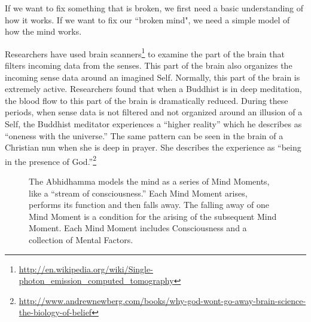 If we want to fix something that is broken, we first need a basic understanding of how it works. If we want to fix our ``broken mind", we need a simple model of how the mind works.

\pagebreak

Researchers have used brain scanners\footnote{\url{http://en.wikipedia.org/wiki/Single-photon_emission_computed_tomography}} to examine the part of the brain that filters incoming data from the senses. This part of the brain also organizes the incoming sense data around an imagined Self. Normally, this part of the brain is extremely active. Researchers found that when a Buddhist is in deep meditation, the blood flow to this part of the brain is dramatically reduced. During these periods, when sense data is not filtered and not organized around an illusion of a Self, the Buddhist meditator experiences a “higher reality” which he describes as “oneness with the universe.” The same pattern can be seen in the brain of a Christian nun when she is deep in prayer. She describes the experience as “being in the presence of God.”\footnote{\url{http://www.andrewnewberg.com/books/why-god-wont-go-away-brain-science-the-biology-of-belief}}

\begin{figure}[H]
\centering

\caption[The Abhidhamma models the mind as a series of Mind Moments, like a “stream of consciousness.” Each Mind Moment arises, performs its function and then falls away. The falling away of one Mind Moment is a condition for the arising of the subsequent Mind Moment. Each Mind Moment includes Consciousness and a collection of Mental Factors.]{The Abhidhamma models the mind as a series of Mind Moments, like a “stream of consciousness.” Each Mind Moment arises, performs its function and then falls away. The falling away of one Mind Moment is a condition for the arising of the subsequent Mind Moment. Each Mind Moment includes Consciousness and a collection of Mental Factors.\footnotemark}
\label{fig:Model}
\end{figure}


